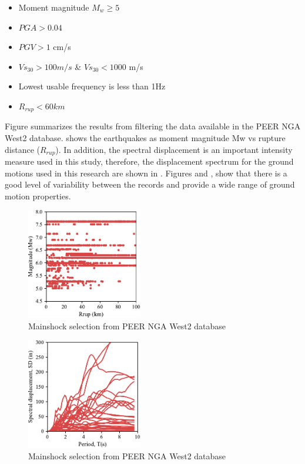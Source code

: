 \begin{itemize}
	\item Moment magnitude $M_w \geqslant 5$
	\item $PGA>0.04$
	\item $PGV>1$ cm/s
	\item $Vs_{30}>100m/s$ \& $Vs_{30}<1000$ m/s
	\item Lowest usable frequency is less than 1Hz
	\item $R_{rup}<60km$
\end{itemize}

Figure  summarizes the results from filtering the data available in the PEER NGA West2 database.  shows the earthquakes as moment magnitude {Mw} vs rupture distance ($R_{rup}$). In addition, the spectral displacement is an important intensity measure used in this study, therefore, the displacement spectrum for the ground motions used in this research are shown in . Figures  and , show that there is a good level of variability between the records and provide a wide range of ground motion properties. 

\begin{figure}[htbp]
	\centering
	\includegraphics[width=0.45\textwidth]{Chapter-5/figs/GM_Selection.pdf}
	\caption{Mainshock selection from PEER NGA West2 database}
	\label{fig:GM_Selection}
\end{figure}

\begin{figure}[htbp]
	\centering
	\includegraphics[width=0.45\textwidth]{Chapter-5/figs/SD_Spectrum_GM_Selection.pdf}
	\caption{Mainshock selection from PEER NGA West2 database}
	\label{fig:DisplacementSpectrum_Selection}
\end{figure}

